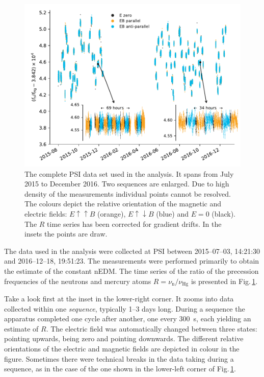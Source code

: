 
\begin{figure}
  \centering
  \includegraphics[width=0.9\linewidth]{gfx/axions/deltah4mm_time_domain_inset_no_yerr.pdf}
  \caption{The complete PSI data set used in the analysis. It spans from July 2015 to December 2016. Two sequences are enlarged. Due to high density of the measurements individual points cannot be resolved. The colours depict the relative orientation of the magnetic and electric fields: $E \uparrow \uparrow B$ (orange), $E \uparrow \downarrow B$ (blue) and $E=0$ (black). The $R$ time series has been corrected for gradient drifts. In the insets the points are draw.}\label{fig:PSI_dataset_time_domain}
\end{figure}

The data used in the analysis were collected at PSI between 2015--07--03, 14:21:30 and 2016--12--18, 19:51:23. The measurements were performed primarily to obtain the estimate of the constant nEDM\@. The time series of the ratio of the precession frequencies of the neutrons and mercury atoms $R = \nu_\text{n} / \nu_\text{Hg}$ is presented in Fig.\,\ref{fig:PSI_dataset_time_domain}.

Take a look first at the inset in the lower-right corner. It zooms into data collected within one \emph{sequence}, typically 1--3 days long.
During a sequence the apparatus completed one cycle after another, one every \SI{300}{\second}, each yielding an estimate of $R$.
The electric field was automatically changed between three states: pointing upwards, being zero and pointing downwards. The different relative orientations of the electric and magnetic fields are depicted in colour in the figure. Sometimes there were technical breaks in the data taking during a sequence, as in the case of the one shown in the lower-left corner of Fig.\,\ref{fig:PSI_dataset_time_domain}.

